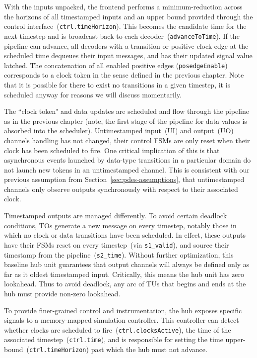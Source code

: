 With the inputs unpacked, the frontend performs a minimum-reduction across the horizons of all timestamped
inputs and an upper bound provided through the control
interface~(\texttt{ctrl.timeHorizon}).  This becomes the candidate time for the
next timestep and is broadcast back to each
decoder~(\texttt{advanceToTime}).  If the pipeline can advance, all decoders
with a transition or positive clock edge at the scheduled time dequeues their
input messages, and has their updated signal value latched.  The concatenation of all
enabled positive edges (\texttt{posedgeEnable}) corresponds to a clock token in
the sense defined in the previous chapter. Note that it is possible for there to exist no
transitions in a given timestep, it is scheduled anyway for reasons we will
discuss momentarily.

The ``clock token" and data updates are scheduled and flow through the pipeline
as in the previous chapter (note, the first stage of the pipeline for data values is absorbed into the scheduler).
Untimestamped input~(UI) and output~(UO) channels handling
has not changed, their control FSMs are only reset when their clock has been
scheduled to fire. One critical implication of this is that asynchronous events
launched by data-type transitions in a particular domain do not launch new
tokens in an untimestamped channel. This is consistent with our previous
assumption from Section~\ref{sec:pdes-assumptions}, that untimestamped channels
only observe outputs synchronously with respect to their associated clock.

Timestamped outputs are managed differently. To avoid certain deadlock
conditions, TOs generate a new message on every timestep,
notably those in which no clock or data transitions have been scheduled. In
effect, these outputs have their FSMs reset on every timestep~(via \texttt{s1\_valid}), and source their
timestamp from the pipeline~(\texttt{s2\_time}).  Without further
optimization, this baseline hub unit guarantees that output channels will
always be defined only as far as it oldest timestamped input.  Critically, this
means the hub unit has zero lookahead. Thus to avoid deadlock,
any arc of TUs that begins and ends at the hub must provide non-zero lookahead.

To provide finer-grained control and instrumentation, the hub exposes specific
signals to a memory-mapped simulation controller. This controller can detect
whether clocks are scheduled to fire~(\texttt{ctrl.clocksActive}), the time of
the associated timestep~(\texttt{ctrl.time}), and is responsible for setting
the time upper-bound~(\texttt{ctrl.timeHorizon}) past which the hub must not
advance.

